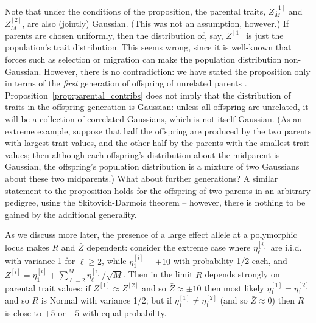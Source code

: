 \documentclass{article}
\newcommand{\1}{\mathbbm{1}}
\theoremstyle{remark}
\theoremstyle{definition}
\begin{document}
Note that under the conditions of the proposition, 
the parental traits, $Z^{[1]}_M$ and $Z^{[2]}_M$,
are also (jointly) Gaussian.
(This was not an assumption, however.)
If parents are chosen uniformly, then
the distribution of, say, $Z^{[1]}$ is just the population's trait distribution.
This seems wrong, since it is well-known that forces such as selection or migration
can make the population distribution non-Gaussian.
However, there is no contradiction:
we have stated the proposition only in terms of the \emph{first} generation
of offspring of unrelated parents \citep[as in][]{barton2017infinitesimal}.
Proposition~\ref{prop:parental_contribs} does not imply that
the distribution of traits in the offspring generation is Gaussian:
unless all offspring are unrelated,
it will be a collection of correlated Gaussians,
which is not itself Gaussian.
(As an extreme example, suppose that half the offspring are produced by the two parents
with largest trait values, and the other half by the parents with the smallest trait values;
then although each offspring's distribution about the midparent is Gaussian,
the offspring's population distribution is a mixture of two Gaussians
about these two midparents.)
What about further generations?
A similar statement to the proposition
holds for the offspring of two parents in an arbitrary pedigree,
using the Skitovich-Darmois theorem \citet{kagan1973characterization}
-- however, there is nothing to be gained by the additional generality.

As we discuss more later,
the presence of a large effect allele at a polymorphic locus 
makes $R$ and $\bar Z$ dependent:
consider the extreme case where $\eta^{[i]}_\ell$ are i.i.d.{} with variance 1 for $\ell \ge 2$,
while $\eta^{[i]}_1 = \pm 10$ with probability 1/2 each,
and $Z^{[i]} = \eta_1^{[i]} + \sum_{\ell=2}^M \eta_\ell^{[i]} / \sqrt{M}$.
Then in the limit $R$ depends strongly on parental trait values:
if $Z^{[1]} \approx Z^{[2]}$ and so $\bar Z \approx \pm 10$ then most likely
$\eta_1^{[1]} = \eta_1^{[2]}$ and so $R$ is Normal with variance 1/2;
but if $\eta_1^{[1]} \neq \eta_1^{[2]}$ (and so $\bar Z \approx 0$)
then $R$ is close to $+5$ or $-5$ with equal probability.

\end{document}
